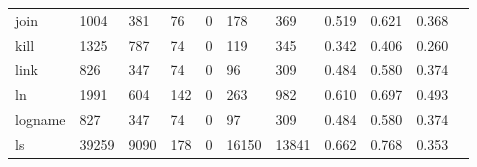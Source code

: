 \begin{longtable}{lp{1.20cm}p{1.20cm}p{1.20cm}p{1.20cm}p{1.20cm}p{1.20cm}p{1.20cm}p{1.20cm}p{1.20cm}p{1.20cm}}
join      &                                  1004 &                                                381 &                                               76 &                                               0 &                                              178 &                                            369 &                                            0.519 &                                              0.621 &                                              0.368 \\
kill      &                                  1325 &                                                787 &                                               74 &                                               0 &                                              119 &                                            345 &                                            0.342 &                                              0.406 &                                              0.260 \\
link      &                                   826 &                                                347 &                                               74 &                                               0 &                                               96 &                                            309 &                                            0.484 &                                              0.580 &                                              0.374 \\
ln        &                                  1991 &                                                604 &                                              142 &                                               0 &                                              263 &                                            982 &                                            0.610 &                                              0.697 &                                              0.493 \\
logname   &                                   827 &                                                347 &                                               74 &                                               0 &                                               97 &                                            309 &                                            0.484 &                                              0.580 &                                              0.374 \\
ls        &                                 39259 &                                               9090 &                                              178 &                                               0 &                                            16150 &                                          13841 &                                            0.662 &                                              0.768 &                                              0.353 \\

\end{longtable}
